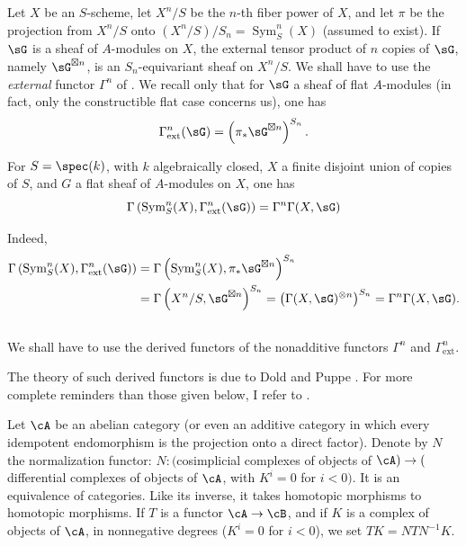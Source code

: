 Let $X$ be an $S$-scheme, let $X^n/S$ be the $n$-th fiber power of $X$, and
let $\pi$ be the projection from $X^n/S$ onto
$(X^n/S)/S_n=\operatorname{Sym}_S^n(X)$ (assumed to exist). If $\sG$ is a
sheaf of $A$-modules on $X$, the external tensor product of $n$ copies of
$\sG$, namely $\sG^{\boxtimes n}$, is an $S_n$-equivariant sheaf on $X^n/S$.
We shall have to use the \emph{external} functor $\Gamma^n$ of
\cite[XVII 5.5.7 to 9]{sga4}. We recall only that for $\sG$ a sheaf of flat
$A$-modules (in fact, only the constructible flat case concerns us), one has
\[
  \Gamma_\text{ext}^n(\sG) = \left(\pi_*\sG^{\boxtimes n}\right)^{S_n} \text{.}
\]






\begin{lemma_}\label{III:1-3}
For $S=\spec(k)$, with $k$ algebraically closed, $X$ a finite disjoint union of
copies of $S$, and $G$ a flat sheaf of $A$-modules on $X$, one has
\[
  \Gamma\left(\operatorname{Sym}_S^n(X),\Gamma_\text{ext}^n(\sG)\right) = \Gamma^n \Gamma(X,\sG)
\]
\end{lemma_}

Indeed,
\begin{align*}
  \Gamma\left(\operatorname{Sym}_S^n(X),\Gamma_\text{ext}^n(\sG)\right)
    &= \Gamma\left(\operatorname{Sym}_S^n(X),\pi_*\sG^{\boxtimes n}\right)^{S_n} \\
    &= \Gamma\left(X^n/S,\sG^{\boxtimes n}\right)^{S_n}
    = \left(\Gamma(X,\sG)^{\otimes n}\right)^{S_n}
    = \Gamma^n \Gamma(X,\sG) \text{.}
\end{align*}






\subsection{}\label{III:1-4}

We shall have to use the derived functors of the nonadditive functors
$\Gamma^n$ and $\Gamma_\text{ext}^n$.

The theory of such derived functors is due to Dold and Puppe
. For more complete reminders than those given below, I refer to
\cite[XVII 5.5.3]{sga4}.

Let $\cA$ be an abelian category (or even an additive category in which every
idempotent endomorphism is the projection onto a direct factor). Denote by $N$
the normalization functor: $N:($cosimplicial complexes of objects of
$\cA)\to($differential complexes of objects of $\cA$, with $K^i=0$ for
$i<0)$. It is an equivalence of categories. Like its inverse, it takes
homotopic morphisms to homotopic morphisms. If $T$ is a functor
$\cA\to\cB$, and if $K$ is a complex of objects of $\cA$, in nonnegative
degrees ($K^i=0$ for $i<0$), we set $T K=N T N^{-1} K$.





